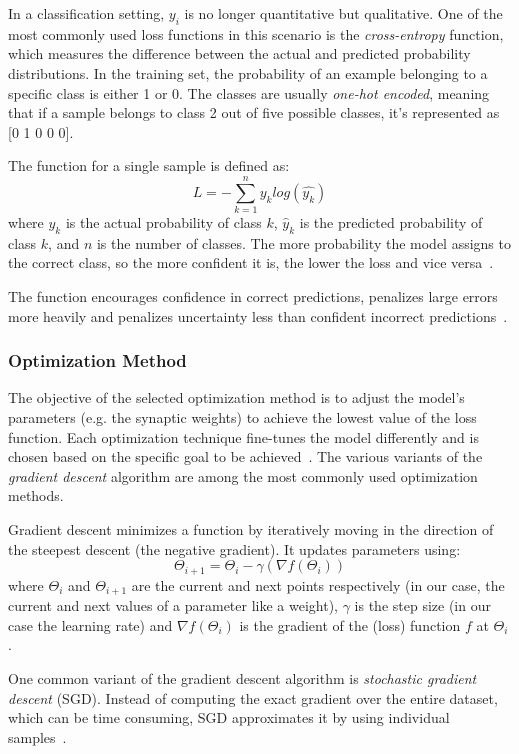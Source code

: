 \documentclass[a4paper,oneside,onecolumn,12pt]{book}
\begin{document}
		In a classification setting, $y_i$ is no longer quantitative but qualitative. One of the most commonly used loss functions in this scenario is the \textit{cross-entropy} function, which measures the difference between the actual and predicted probability distributions. In the training set, the probability of an example belonging to a specific class is either 1 or 0. The classes are usually \textit{one-hot encoded}, meaning that if a sample belongs to class 2 out of five possible classes, it's represented as [0 1 0 0 0].

		The function for a single sample is defined as:
		\[ L = -\sum_{k=1}^{n} y_k log(\hat{y_k}) \]
		where $y_k$ is the actual probability of class $k$, $\hat{y}_k$ is the predicted probability of class $k$, and $n$ is the number of classes. The more probability the model assigns to the correct class, so the more confident it is, the lower the loss and vice versa~\cite{AISL}.

		The function encourages confidence in correct predictions, penalizes large errors more heavily and penalizes uncertainty less than confident incorrect predictions~\cite{BOCEL}.

		\subsubsection{Optimization Method}
		The objective of the selected optimization method is to adjust the model's parameters (e.g. the synaptic weights) to achieve the lowest value of the loss function. Each optimization technique fine-tunes the model differently and is chosen based on the specific goal to be achieved~\cite{COOTMLT}. The various variants of the \textit{gradient descent} algorithm are among the most commonly used optimization methods.

		Gradient descent minimizes a function by iteratively moving in the direction of the steepest descent (the negative gradient). It updates parameters using:
		\[ \Theta_{i+1} = \Theta_{i} - \gamma(\nabla f(\Theta_i)) \]
		where $\Theta_{i}$ and $\Theta_{i+1}$ are the current and next points respectively (in our case, the current and next values of a parameter like a weight), $\gamma$ is the step size (in our case the learning rate) and $\nabla f(\Theta_i)$ is the gradient of the (loss) function $f$ at $\Theta_i$.

		One common variant of the gradient descent algorithm is \textit{stochastic gradient descent} (SGD). Instead of computing the exact gradient over the entire dataset, which can be time consuming, SGD approximates it by using individual samples~\cite{MML}.
\end{document}
